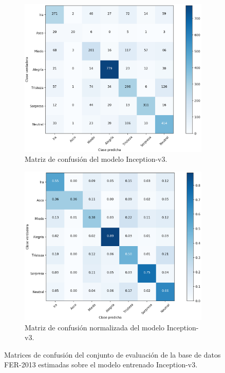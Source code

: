 \begin{figure}
    \centering
    \begin{subfigure}[t]{\textwidth}
      \centering
      \includegraphics[width=0.7\linewidth]{Images/Inception-v3_matrix.png}
      \caption{Matriz de confusión del modelo Inception-v3.}
      \label{fig:Inception-v3_matrix}
    \end{subfigure}
    
    \vspace{1cm}
    \begin{subfigure}[t]{\textwidth}
      \centering
      \includegraphics[width=0.7\linewidth]{Images/Inception-v3_matrix_norm.png}
      \caption{Matriz de confusión normalizada del modelo Inception-v3.}
      \label{fig:Inception-v3_matrix_norm}
    \end{subfigure}
    \caption{Matrices de confusión del conjunto de evaluación de la base de datos FER-2013 estimadas sobre el modelo entrenado Inception-v3.}
    \label{fig:Inception-v3_matrices}
\end{figure}

